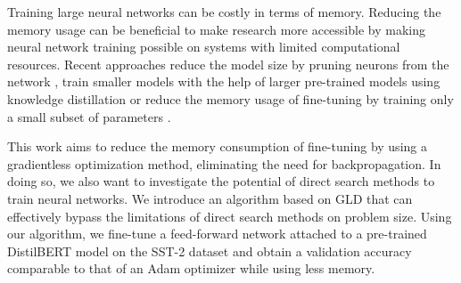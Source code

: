 Training large neural networks can be costly 
in terms of memory. 
Reducing the memory usage can be beneficial to make 
research more accessible by making neural network training 
possible on systems with limited computational resources.
Recent approaches reduce the model size by pruning
neurons from the network \parencite{pruning}, 
train smaller models with the help of larger pre-trained 
models using knowledge distillation \parencite{distillation}
or reduce the memory usage of fine-tuning by training only 
a small subset of parameters \parencite{peft}. 

This work
aims to reduce the memory consumption of fine-tuning 
by using a gradientless optimization method, eliminating 
the need for backpropagation. In doing so, 
we also want to investigate the potential of 
direct search methods to train neural networks. We 
introduce an algorithm based on \ac{GLD} that can 
effectively bypass the limitations of direct search methods 
on problem size. Using
our algorithm, we fine-tune a feed-forward network 
attached to a pre-trained DistilBERT 
model \parencite{distilbert} on the SST-2 dataset 
\parencite{sst2} and obtain 
a validation accuracy comparable to that of an 
Adam optimizer \parencite{adam} while using less memory.



